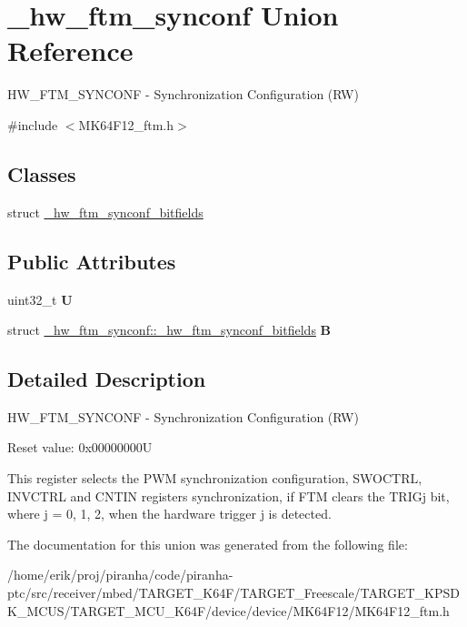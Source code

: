 \hypertarget{union__hw__ftm__synconf}{}\section{\+\_\+hw\+\_\+ftm\+\_\+synconf Union Reference}
\label{union__hw__ftm__synconf}


H\+W\+\_\+\+F\+T\+M\+\_\+\+S\+Y\+N\+C\+O\+NF -\/ Synchronization Configuration (RW)  




{\ttfamily \#include $<$M\+K64\+F12\+\_\+ftm.\+h$>$}

\subsection*{Classes}
\begin{DoxyCompactItemize}
\item 
struct \hyperlink{struct__hw__ftm__synconf_1_1__hw__ftm__synconf__bitfields}{\+\_\+hw\+\_\+ftm\+\_\+synconf\+\_\+bitfields}
\end{DoxyCompactItemize}
\subsection*{Public Attributes}
\begin{DoxyCompactItemize}
\item 
uint32\+\_\+t {\bfseries U}\hypertarget{union__hw__ftm__synconf_a82f9074813a6e58ae887871a41a90dfd}{}\label{union__hw__ftm__synconf_a82f9074813a6e58ae887871a41a90dfd}

\item 
struct \hyperlink{struct__hw__ftm__synconf_1_1__hw__ftm__synconf__bitfields}{\+\_\+hw\+\_\+ftm\+\_\+synconf\+::\+\_\+hw\+\_\+ftm\+\_\+synconf\+\_\+bitfields} {\bfseries B}\hypertarget{union__hw__ftm__synconf_a665e91eb0fe04e0faeb8e3945c794f60}{}\label{union__hw__ftm__synconf_a665e91eb0fe04e0faeb8e3945c794f60}

\end{DoxyCompactItemize}


\subsection{Detailed Description}
H\+W\+\_\+\+F\+T\+M\+\_\+\+S\+Y\+N\+C\+O\+NF -\/ Synchronization Configuration (RW) 

Reset value\+: 0x00000000U

This register selects the P\+WM synchronization configuration, S\+W\+O\+C\+T\+RL, I\+N\+V\+C\+T\+RL and C\+N\+T\+IN registers synchronization, if F\+TM clears the T\+R\+I\+Gj bit, where j = 0, 1, 2, when the hardware trigger j is detected. 

The documentation for this union was generated from the following file\+:\begin{DoxyCompactItemize}
\item 
/home/erik/proj/piranha/code/piranha-\/ptc/src/receiver/mbed/\+T\+A\+R\+G\+E\+T\+\_\+\+K64\+F/\+T\+A\+R\+G\+E\+T\+\_\+\+Freescale/\+T\+A\+R\+G\+E\+T\+\_\+\+K\+P\+S\+D\+K\+\_\+\+M\+C\+U\+S/\+T\+A\+R\+G\+E\+T\+\_\+\+M\+C\+U\+\_\+\+K64\+F/device/device/\+M\+K64\+F12/M\+K64\+F12\+\_\+ftm.\+h\end{DoxyCompactItemize}
